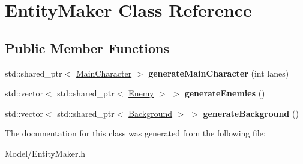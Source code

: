 \hypertarget{class_entity_maker}{}\section{Entity\+Maker Class Reference}
\label{class_entity_maker}
\subsection*{Public Member Functions}
\begin{DoxyCompactItemize}
\item 
\mbox{\label{class_entity_maker_a6df64267ba7e9ae80a5c6ecf3805029f}} 
std\+::shared\+\_\+ptr$<$ \hyperlink{class_main_character}{Main\+Character} $>$ {\bfseries generate\+Main\+Character} (int lanes)
\item 
\mbox{\label{class_entity_maker_a5253324877ee4cb0eec7868f6fb8c36c}} 
std\+::vector$<$ std\+::shared\+\_\+ptr$<$ \hyperlink{class_enemy}{Enemy} $>$ $>$ {\bfseries generate\+Enemies} ()
\item 
\mbox{\label{class_entity_maker_a74af0a50deaa3dce647359d53f01f7fd}} 
std\+::vector$<$ std\+::shared\+\_\+ptr$<$ \hyperlink{class_background}{Background} $>$ $>$ {\bfseries generate\+Background} ()
\end{DoxyCompactItemize}


The documentation for this class was generated from the following file\+:\begin{DoxyCompactItemize}
\item 
Model/Entity\+Maker.\+h\end{DoxyCompactItemize}
